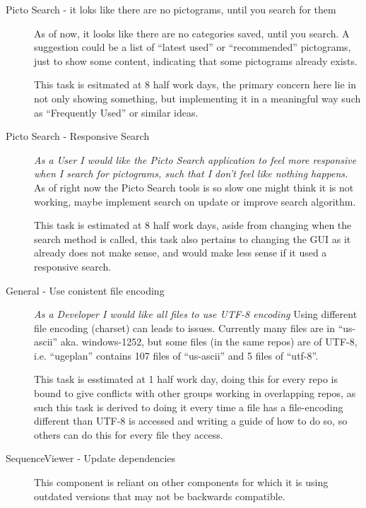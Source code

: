 \begin{description}
    \item[Picto Search - it loks like there are no pictograms, until you search for them]
        As of now, it looks like there are no categories saved, until you search.
        A suggestion could be a list of ``latest used'' or ``recommended'' pictograms, just to show some content, indicating that some pictograms already exists.

        This task is esitmated at 8 half work days, the primary concern here lie in not only showing something, but implementing it in a meaningful way such as ``Frequently Used'' or similar ideas.
    \item[Picto Search - Responsive Search]
        \textit{As a User I would like the Picto Search application to feel more responsive when I search for pictograms, such that I don't feel like nothing happens.}
        As of right now the Picto Search tools is so slow one might think it is not working, maybe implement search on update or improve search algorithm.

        This task is estimated at 8 half work days, aside from changing when the search method is called, this task also pertains to changing the GUI as it already does not make sense, and would make less sense if it used a responsive search.
    \item[General - Use conistent file encoding]
        \textit{As a Developer I would like all files to use UTF-8 encoding}
        Using different file encoding (charset) can leads to issues. 
        Currently many files are in ``us-ascii'' aka. windows-1252, but some files (in the same repos) are of UTF-8, i.e. ``ugeplan'' contains 107 files of ``us-ascii'' and 5 files of ``utf-8''. 

        This task is esstimated at 1 half work day, doing this for every repo is bound to give conflicts with other groups working in overlapping repos, as such this task is derived to doing it every time a file has a file-encoding different than UTF-8 is accessed and writing a guide of how to do so, so others can do this for every file they access.
    \item[SequenceViewer - Update dependencies]
        This component is reliant on other components for which it is using outdated versions that may not be backwards compatible.


\end{description}
